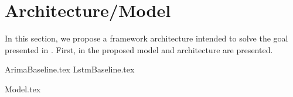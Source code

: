 \chapter{Architecture/Model}
\label{section:Architecture}

In this section, we propose a framework architecture intended to solve the goal presented in .
First, in  the proposed model and architecture are presented.

{ArimaBaseline.tex}
{LstmBaseline.tex}

{Model.tex}


